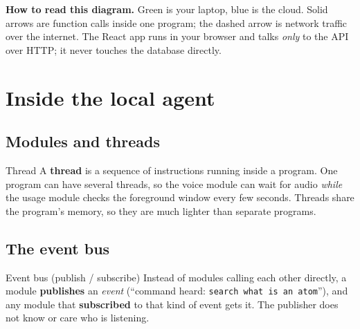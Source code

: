 \documentclass[11pt,a4paper]{article}
\begin{document}
\begin{center}
\end{center}

\noindent\textbf{How to read this diagram.} Green is your laptop, blue is the cloud. Solid
arrows are function calls inside one program; the dashed arrow is network traffic over the
internet. The React app runs in your browser and talks \emph{only} to the API over HTTP;
it never touches the database directly.

\section{Inside the local agent}\label{sec:inside}

\subsection{Modules and threads}
\begin{concept}{Thread}
A \textbf{thread} is a sequence of instructions running inside a program. One program can
have several threads, so the voice module can wait for audio \emph{while} the usage module
checks the foreground window every few seconds. Threads share the program's memory, so
they are much lighter than separate programs.
\end{concept}

\subsection{The event bus}
\begin{concept}{Event bus (publish / subscribe)}
Instead of modules calling each other directly, a module \textbf{publishes} an
\emph{event} (``command heard: \texttt{search what is an atom}''), and any module that
\textbf{subscribed} to that kind of event gets it. The publisher does not know or care who
is listening.
\end{concept}
\end{document}
